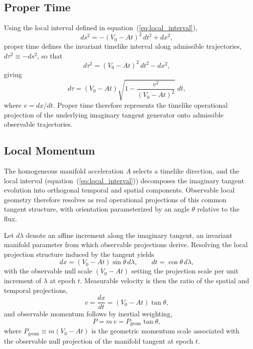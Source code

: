 \documentclass[fontsize=12pt, paper=a4]{scrartcl}
\begin{document}
\subsection{Proper Time}
Using the local interval defined in equation~(\ref{eq:local_interval}),
\begin{equation}
ds^2 = -(V_0 - At)^2\,dt^2 + dx^2,
\end{equation}
proper time defines the invariant timelike interval along admissible trajectories, $d\tau^2 \equiv -ds^2$, so that
\begin{equation}
d\tau^2 = (V_0 - At)^2\,dt^2 - dx^2,
\end{equation}
giving
\begin{equation}
d\tau = (V_0 - At)\sqrt{1 - \frac{v^2}{(V_0 - At)^2}}\;dt,
\end{equation}
where $v = dx/dt$. Proper time therefore represents the timelike operational projection of the underlying imaginary tangent generator onto admissible observable trajectories.

\subsection{Local Momentum}

The homogeneous manifold acceleration $A$ selects a timelike direction, and the local interval (equation~(\ref{eq:local_interval})) decomposes the imaginary tangent evolution into orthogonal temporal and spatial components. Observable local geometry therefore resolves as real operational projections of this common tangent structure, with orientation parameterized by an angle $\theta$ relative to the flux.

Let $d\lambda$ denote an affine increment along the imaginary tangent, an invariant manifold parameter from which observable projections derive. Resolving the local projection structure induced by the tangent yields
\begin{equation}
dx = (V_0 - At)\sin\theta\,d\lambda,\qquad dt = \cos\theta\,d\lambda,
\end{equation}
with the observable null scale $(V_0-At)$ setting the projection scale per unit increment of $\lambda$ at epoch $t$. Measurable velocity is then the ratio of the spatial and temporal projections,
\begin{equation}
v = \frac{dx}{dt} = (V_0 - At)\tan\theta,
\end{equation}
and observable momentum follows by inertial weighting,
\begin{equation}
P = m\,v = P_{\mathrm{geom}}\tan\theta,
\end{equation}
where $P_{\mathrm{geom}} \equiv m(V_0-At)$ is the geometric momentum scale associated with the observable null projection of the manifold tangent at epoch $t$.
\end{document}
